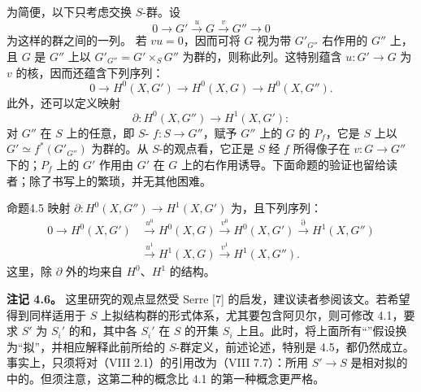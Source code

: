 为简便，以下只考虑交换 $S$-群。设
\[
0\longrightarrow G'\xrightarrow{u}G\xrightarrow{v}G''\longrightarrow0
\]
为这样的群之间的一列。
若 $vu=0$，因而可将 $G$ 视为带 $G'_{G''}$ 右作用的 $G''$ 上，且 $G$ 是 $G''$ 上以 $G'_{G''}=G'\times_SG''$ 为群的，则称此列。这特别蕴含 $u:G'\to G$ 为 $v$ 的核，因而还蕴含下列序列：
\[
0\longrightarrow H^0(X,G')\longrightarrow H^0(X,G)\longrightarrow H^0(X,G'').
\]
此外，还可以定义映射
\[
\partial:H^0(X,G'')\longrightarrow H^1(X,G'):
\]
对 $G''$ 在 $S$ 上的任意，即 $S$- $f:S\to G''$，赋予 $G''$ 上的 $G$ 的 $P_f$，它是 $S$ 上以 $G'\simeq f^*(G'_{G''})$ 为群的。从 $S$-的观点看，它正是 $S$ 经 $f$ 所得像子在 $v:G\to G''$ 下的；$P_f$ 上的 $G'$ 作用由 $G'$ 在 $G$ 上的右作用诱导。下面命题的验证也留给读者；除了书写上的繁琐，并无其他困难。

\begin{SGAresult}{命题}{4.5}
映射 $\partial:H^0(X,G'')\to H^1(X,G')$ 为，且下列序列：
\[
\begin{aligned}
0\longrightarrow H^0(X,G')&\xrightarrow{u^0}H^0(X,G)
\xrightarrow{v^0}H^0(X,G')\xrightarrow{\partial}H^1(X,G'')\\
&\xrightarrow{u^1}H^1(X,G)\xrightarrow{v^1}H^1(X,G'').
\end{aligned}
\]
这里，除 $\partial$ 外的均来自 $H^0$、$H^1$ 的结构。
\end{SGAresult}

\textbf{注记 4.6。} 这里研究的观点显然受 Serre [7] 的启发，建议读者参阅该文。若希望得到同样适用于 $S$ 上拟结构群的形式体系，尤其要包含阿贝尔，则可修改 4.1，要求 $S'$ 为 $S_i'$ 的和，其中各 $S_i'$ 在 $S$ 的开集 $S_i$ 上且。此时，将上面所有“”假设换为“拟”，并相应解释此前所给的 $S$-群定义，前述论述，特别是 4.5，都仍然成立。事实上，只须将对（VIII 2.1）的引用改为（VIII 7.7）：所用 $S'\to S$ 是相对拟的中的。但须注意，这第二种的概念比 4.1 的第一种概念更严格。

